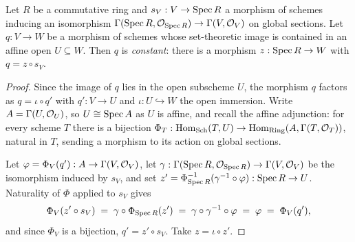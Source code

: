 \begin{lemma}[Constancy]
  \label{pa-lem:constant_into_affine}
  \leanok

  Let \(R\) be a commutative ring and \(s_V : V \to \operatorname{Spec} R\) a morphism of schemes inducing
  an isomorphism \(\Gamma(\operatorname{Spec} R, \mathcal{O}_{\operatorname{Spec} R}) \to \Gamma(V, \mathcal{O}_{V})\) on global
  sections. Let \(q : V \to W\) be a morphism of schemes whose set-theoretic image is
  contained in an affine open \(U \subseteq W\). Then \(q\) is \emph{constant}: there is a
  morphism \(z : \operatorname{Spec} R \to W\) with \(q = z \circ s_V\).
\end{lemma}
\begin{proof}
  \leanok
  Since the image of \(q\) lies in the open subscheme \(U\), the morphism \(q\) factors as
  \(q = \iota \circ q'\) with \(q' : V \to U\) and \(\iota : U \hookrightarrow W\) the open
  immersion. Write \(A = \Gamma(U, \mathcal{O}_{U})\), so \(U \cong \operatorname{Spec} A\) as \(U\) is affine,
  and recall the affine adjunction: for every scheme \(T\) there is a bijection
  \(\Phi_T : \operatorname{Hom}_{\mathrm{Sch}}(T, U) \to \operatorname{Hom}_{\mathrm{Ring}}(A, \Gamma(T, \mathcal{O}_{T}))\),
  natural in \(T\), sending a morphism to its action on global sections.

  Let \(\varphi = \Phi_V(q') : A \to \Gamma(V, \mathcal{O}_{V})\), let
  \(\gamma : \Gamma(\operatorname{Spec} R, \mathcal{O}_{\operatorname{Spec} R}) \to \Gamma(V, \mathcal{O}_{V})\) be the isomorphism
  induced by \(s_V\), and set
  \(z' = \Phi_{\operatorname{Spec} R}^{-1}(\gamma^{-1} \circ \varphi) : \operatorname{Spec} R \to U\). Naturality of
  \(\Phi\) applied to \(s_V\) gives
  \[
    \Phi_V(z' \circ s_V) \;=\; \gamma \circ \Phi_{\operatorname{Spec} R}(z')
      \;=\; \gamma \circ \gamma^{-1} \circ \varphi \;=\; \varphi \;=\; \Phi_V(q'),
  \]
  and since \(\Phi_V\) is a bijection, \(q' = z' \circ s_V\). Take \(z = \iota \circ z'\).
\end{proof}

